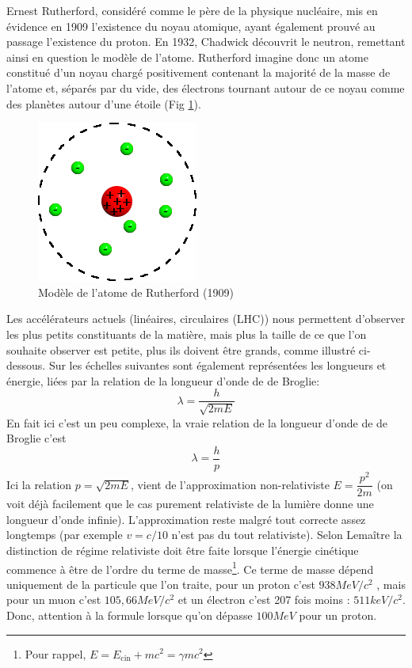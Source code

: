 Ernest Rutherford, considéré comme le père de la physique nucléaire, mis en évidence en 1909 l'existence du noyau atomique, ayant également prouvé au passage l'existence du proton. En 1932, Chadwick découvrit le neutron, remettant ainsi en question le modèle de l'atome. Rutherford imagine donc un atome constitué d'un noyau chargé positivement contenant la majorité de la masse de l'atome et, séparés par du vide, des électrons tournant autour de ce noyau comme des planètes autour d'une étoile (Fig \ref{fig:modele_rutherford}).

\begin{figure}[ht]
    \centering
    \includegraphics[scale=0.65]{Images1/modelerutherford.png}
    \caption{Modèle de l'atome de Rutherford (1909)}
    \label{fig:modele_rutherford}
\end{figure}

Les accélérateurs actuels (linéaires, circulaires (LHC)) nous permettent d'observer les plus petits constituants de la matière, mais plus la taille de ce que l'on souhaite observer est petite, plus ils doivent être grands, comme illustré ci-dessous. Sur les échelles suivantes sont également représentées les longueurs et énergie, liées par la relation de la longueur d'onde de de Broglie:
\[ \lambda=\dfrac{h}{\sqrt{2mE}} \]
En fait ici c'est un peu complexe, la vraie relation de la longueur d'onde de de Broglie c'est
\[\lambda=\dfrac{h}{p}\]
Ici la relation $p = \sqrt{2mE}$, vient de l'approximation non-relativiste $E = \dfrac{p^{2}}{2m}$ (on voit déjà facilement que le cas purement relativiste de la lumière donne une longueur d'onde infinie). L'approximation reste malgré tout correcte assez longtemps (par exemple $v = c/10$ n'est pas du tout relativiste). Selon Lemaître la distinction de régime relativiste doit être faite lorsque l'énergie cinétique commence à être de l'ordre du terme de masse\footnote{Pour rappel, $E = E_\text{cin} + mc^2 = \gamma mc^2$}. Ce terme de masse dépend uniquement de la particule que l'on traite, pour un proton c'est $938MeV/c^2$ , mais pour un muon c'est $105,66 MeV/c^2$ et un électron c'est 207 fois moins : $511keV/c^2$. Donc, attention à la formule lorsque qu'on dépasse $100 MeV$ pour un proton.

